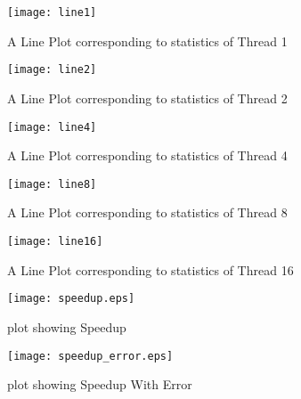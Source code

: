 \documentclass{article}
\begin{document}
\newpage
\begin{figure*}[!ht]
    \centering
    \texttt{[image: line1]}
    \caption{A Line Plot corresponding to statistics of Thread 1}
    \label{fig:sc1}
\end{figure*}
\begin{figure*}[!ht]
    \centering
    \texttt{[image: line2]}
    \caption{A Line Plot corresponding to statistics of Thread 2}
    \label{fig:sc2}
\end{figure*}
\begin{figure*}[!ht]
    \centering
    \texttt{[image: line4]}
    \caption{A Line Plot corresponding to statistics of Thread 4}
    \label{fig:sc4}
\end{figure*}
\begin{figure*}[!ht]
    \centering
    \texttt{[image: line8]}
    \caption{A Line Plot corresponding to statistics of Thread 8}
    \label{fig:sc8}
\end{figure*}
\begin{figure*}[!ht]
    \centering
    \texttt{[image: line16]}
    \caption{A Line Plot corresponding to statistics of Thread 16}
    \label{fig:ln16}
\end{figure*}

\newpage
\begin{figure}[!ht]
\centering
    \texttt{[image: speedup.eps]}
    \caption{plot showing Speedup}
\end{figure}


\begin{figure}[!ht]
\centering
    \texttt{[image: speedup\_error.eps]}
    \caption{plot showing Speedup With Error }
\end{figure}
\end{document}
